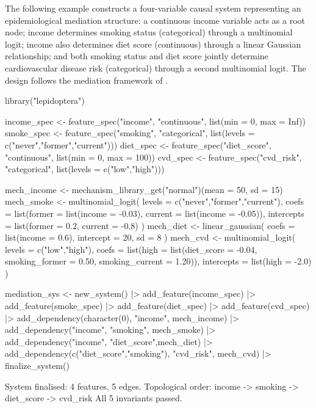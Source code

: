 \documentclass[12pt]{article}
\begin{document}
The following example constructs a four-variable causal system representing an
epidemiological mediation structure: a continuous income variable acts as a root
node; income determines smoking status (categorical) through a multinomial logit;
income also determines diet score (continuous) through a linear Gaussian
relationship; and both smoking status and diet score jointly determine
cardiovascular disease risk (categorical) through a second multinomial logit. The
design follows the mediation framework of \citet{vanderweele2015explanation}.

\begin{CodeInput}
library("lepidoptera")

income_spec  <- feature_spec("income",     "continuous",
                             list(min = 0, max = Inf))
smoke_spec   <- feature_spec("smoking",    "categorical",
                             list(levels = c("never","former","current")))
diet_spec    <- feature_spec("diet_score", "continuous",
                             list(min = 0, max = 100))
cvd_spec     <- feature_spec("cvd_risk",   "categorical",
                             list(levels = c("low","high")))

mech_income <- mechanism_library_get("normal")(mean = 50, sd = 15)
mech_smoke  <- multinomial_logit(
  levels     = c("never","former","current"),
  coefs      = list(former  = list(income = -0.03),
                    current = list(income = -0.05)),
  intercepts = list(former  =  0.2, current = -0.8)
)
mech_diet   <- linear_gaussian(
  coefs = list(income = 0.6), intercept = 20, sd = 8
)
mech_cvd    <- multinomial_logit(
  levels     = c("low","high"),
  coefs      = list(high = list(diet_score      = -0.04,
                                smoking_former  =  0.50,
                                smoking_current =  1.20)),
  intercepts = list(high = -2.0)
)

mediation_sys <- new_system()                                      |>
  add_feature(income_spec) |> add_feature(smoke_spec)             |>
  add_feature(diet_spec)   |> add_feature(cvd_spec)               |>
  add_dependency(character(0), "income",    mech_income)          |>
  add_dependency("income",     "smoking",   mech_smoke)           |>
  add_dependency("income",     "diet_score",mech_diet)            |>
  add_dependency(c("diet_score","smoking"), "cvd_risk", mech_cvd) |>
  finalize_system()
\end{CodeInput}

\begin{CodeOutput}
System finalised: 4 features, 5 edges.
Topological order: income -> smoking -> diet_score -> cvd_risk
All 5 invariants passed.
\end{CodeOutput}
\end{document}
